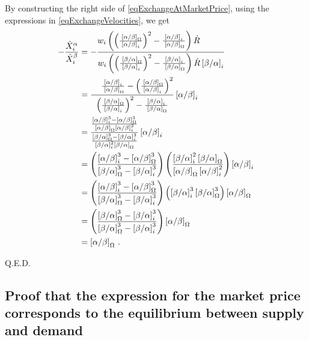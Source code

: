 \documentclass[letterpaper]{article}
\newcommand{\priceAB}{\left[\alpha / \beta\right]}
\newcommand{\priceBA}{\left[\beta / \alpha\right]}
\begin{document}
By constructing the right side of \eqref{eqExchangeAtMarketPrice}, using the expressions in \eqref{eqExchangeVelocities}, we get
\begin{align*}
    -\frac{\dot{X}^\alpha_i}{\dot{X}^\beta_i} &= -\frac{\hspace{-29pt}w_i \left( \left( \frac{\hspace{2pt}\priceAB_\Omega}{\priceAB_i}\right)^2 - \frac{\priceAB_i}{\hspace{2pt}\priceAB_\Omega} \right) \dot{R}}{w_i \left( \left( \frac{\hspace{2pt}\priceBA_\Omega}{\priceBA_i}\right)^2 - \frac{\priceBA_i}{\hspace{2pt}\priceBA_\Omega} \right) \dot{R} \priceBA_i}\\
    &= \frac{\hspace{12pt}\frac{\priceAB_i}{\hspace{2pt}\priceAB_\Omega} - \left( \frac{\hspace{2pt}\priceAB_\Omega}{\priceAB_i}\right)^2 }{\left( \frac{\hspace{2pt}\priceBA_\Omega}{\priceBA_i}\right)^2 - \frac{\priceBA_i}{\hspace{2pt}\priceBA_\Omega}} \priceAB_i\\
    &=\frac{\frac{\priceAB_i^3-\priceAB_\Omega^3}{\priceAB_\Omega \priceAB_i^2}}{\frac{\priceBA_\Omega^3-\priceBA_i^3}{\priceBA_i^2 \priceBA_\Omega}} \priceAB_i\\
    &= \left(\frac{\priceAB_i^3-\priceAB_\Omega^3}{\priceBA_\Omega^3-\priceBA_i^3} \right)\left(\frac{\priceBA_i^2 \priceBA_\Omega}{\priceAB_\Omega \priceAB_i^2} \right)\priceAB_i\\
    &= \left(\frac{\priceAB_i^3-\priceAB_\Omega^3}{\priceBA_\Omega^3-\priceBA_i^3} \right) \left(\priceBA_i^3 \priceBA_\Omega^3\right)\priceAB_\Omega\\
    &= \left( \frac{\priceBA_\Omega^3 - \priceBA_i^3}{\priceBA_\Omega^3 - \priceBA_i^3}\right) \priceAB_\Omega \\
    &= \priceAB_\Omega \,.
\end{align*}
\begin{flushright}
Q.E.D.
\end{flushright}

\subsection{Proof that the expression for the market price corresponds to the equilibrium between supply and demand}\label{secProofMarketprice}
\end{document}
